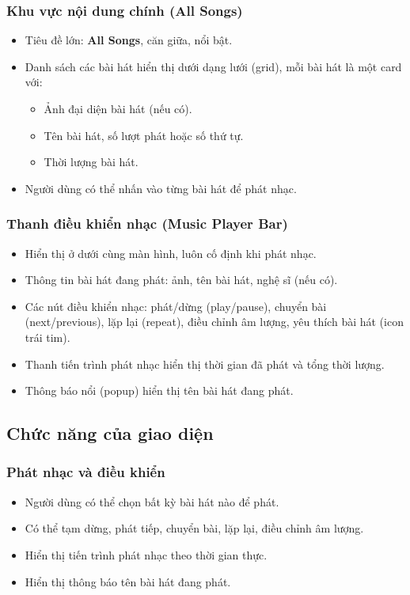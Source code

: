\documentclass{book}
\begin{document}
\subsubsection{Khu vực nội dung chính (All Songs)}
\begin{itemize}
    \item Tiêu đề lớn: \textbf{All Songs}, căn giữa, nổi bật.
    \item Danh sách các bài hát hiển thị dưới dạng lưới (grid), mỗi bài hát là một card với:
    \begin{itemize}
        \item Ảnh đại diện bài hát (nếu có).
        \item Tên bài hát, số lượt phát hoặc số thứ tự.
        \item Thời lượng bài hát.
    \end{itemize}
    \item Người dùng có thể nhấn vào từng bài hát để phát nhạc.
\end{itemize}

\subsubsection{Thanh điều khiển nhạc (Music Player Bar)}
\begin{itemize}
    \item Hiển thị ở dưới cùng màn hình, luôn cố định khi phát nhạc.
    \item Thông tin bài hát đang phát: ảnh, tên bài hát, nghệ sĩ (nếu có).
    \item Các nút điều khiển nhạc: phát/dừng (play/pause), chuyển bài (next/previous), lặp lại (repeat), điều chỉnh âm lượng, yêu thích bài hát (icon trái tim).
    \item Thanh tiến trình phát nhạc hiển thị thời gian đã phát và tổng thời lượng.
    \item Thông báo nổi (popup) hiển thị tên bài hát đang phát.
\end{itemize}

\subsection{Chức năng của giao diện}

\subsubsection{Phát nhạc và điều khiển}
\begin{itemize}
    \item Người dùng có thể chọn bất kỳ bài hát nào để phát.
    \item Có thể tạm dừng, phát tiếp, chuyển bài, lặp lại, điều chỉnh âm lượng.
    \item Hiển thị tiến trình phát nhạc theo thời gian thực.
    \item Hiển thị thông báo tên bài hát đang phát.
\end{itemize}
\end{document}
